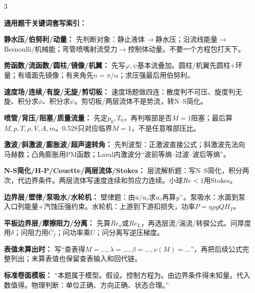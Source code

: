 \documentclass[a4paper]{article}
\newcommand{\sect}[1]{\par{\bfseries\color{Q}#1：}}
\begin{document}
\begin{multicols}{3}
{\sect{通用题干关键词套写索引}
\sect{静水压/伯努利/动量}
先判断对象：静止液体$\to$静水压；沿流线能量$\to$Bernoulli/机械能；弯管喷嘴射流受力$\to$控制体动量。不要一个方程包打天下。
\sect{势函数/流函数/圆柱/镜像/机翼}
先写$\varphi,\psi$基本流叠加。圆柱/机翼先圆柱+环量；有墙面先镜像；有夹角先$n=\pi/\alpha$；求压强最后用伯努利。
\sect{速度场/连续/有旋/无旋/剪切板}
速度场题做四连：散度判不可压、旋度判无旋、积分求$\phi$、积分求$\psi$。剪切板/两层流体不是势流，转N--S简化。
\sect{喷管/背压/阻塞/质量流量}
先定$p_0,T_0$，再判喉部是否$M=1$阻塞；最后算$M,p,T,\rho,V,A,\dot m$。0.528只对应临界$M=1$，不是任意喉部压比。
\sect{激波/斜激波/膨胀波/超声速转角}
先判波型：正激波直接公式；斜激波先法向马赫数；凸角膨胀用PM函数；Laval内激波分“波前等熵--过波--波后等熵”。
\sect{N-S简化/H-P/Couette/两层流体/Stokes}
层流解析题：写N--S简化，积分两次，代边界条件。两层流体写速度连续和剪应力连续。小球$Re<1$用Stokes。
\sect{边界层/壁律/泵吸水/水轮机}
壁律题：由$\bar u/u_\tau$求$u_\tau$再算$y^+$。泵吸水：水面到泵入口列能量+汽蚀压强约束。水轮机：上游到下游扣损失，功率$P=\eta\rho gQH_T$。
\sect{平板边界层/摩擦阻力/分离}
先算$Re_x$或$Re_L$，再选层流/湍流/转捩公式。问厚度用$\delta$；问阻力用$\bar C_f$；问功率乘$U$；问分离写逆压梯度。
\sect{表值未算出时}
写“查表得$M=...,\lambda=...,\beta=...,\nu(M)=...$”，再把后续公式完整列出；未算表值也保留查表输入和回代链。
\sect{标准卷面模板}
“本题属于\underline{\hspace{1cm}}模型。假设\underline{\hspace{1cm}}。控制方程为\underline{\hspace{1cm}}。由边界条件\underline{\hspace{1cm}}得未知量。代入数值得\underline{\hspace{1cm}}。物理判断：单位正确、方向正确、状态合理。”

}
\end{multicols}
\end{document}
